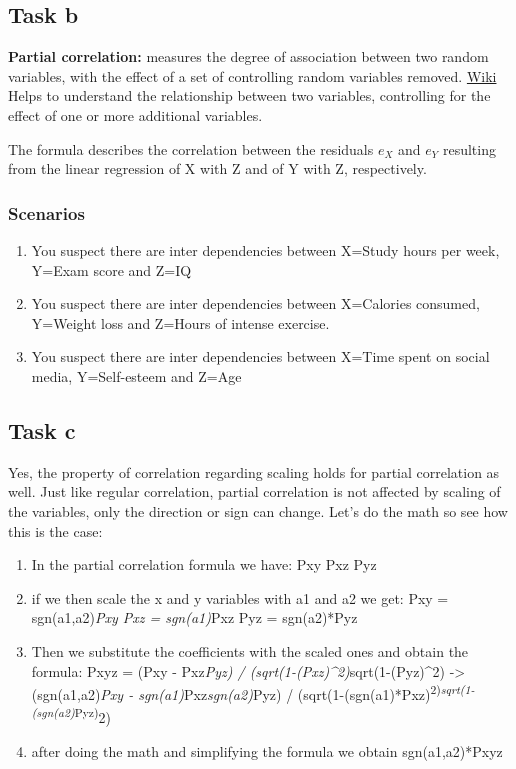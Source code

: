 \documentclass[
]{article}
\providecommand{\tightlist}{%
  \setlength{\itemsep}{0pt}\setlength{\parskip}{0pt}}
\begin{document}
\subsection{Task b}\label{task-b-3}

\textbf{Partial correlation:} measures the degree of association between
two random variables, with the effect of a set of controlling random
variables removed.
\href{https://en.wikipedia.org/wiki/Partial_correlation}{Wiki} Helps to
understand the relationship between two variables, controlling for the
effect of one or more additional variables.

The formula describes the correlation between the residuals \(e_X\) and
\(e_Y\) resulting from the linear regression of X with Z and of Y with
Z, respectively.

\subsubsection{Scenarios}\label{scenarios}

\begin{enumerate}
\def\labelenumi{\arabic{enumi}.}
\tightlist
\item
  You suspect there are inter dependencies between X=Study hours per
  week, Y=Exam score and Z=IQ
\item
  You suspect there are inter dependencies between X=Calories consumed,
  Y=Weight loss and Z=Hours of intense exercise.
\item
  You suspect there are inter dependencies between X=Time spent on
  social media, Y=Self-esteem and Z=Age
\end{enumerate}

\subsection{Task c}\label{task-c-3}

Yes, the property of correlation regarding scaling holds for partial
correlation as well. Just like regular correlation, partial correlation
is not affected by scaling of the variables, only the direction or sign
can change. Let's do the math so see how this is the case:

\begin{enumerate}
\def\labelenumi{\arabic{enumi}.}
\item
  In the partial correlation formula we have: Pxy Pxz Pyz
\item
  if we then scale the x and y variables with a1 and a2 we get: Pxy =
  sgn(a1,a2)\emph{Pxy Pxz = sgn(a1)}Pxz Pyz = sgn(a2)*Pyz
\item
  Then we substitute the coefficients with the scaled ones and obtain
  the formula: Pxy\textbar z = (Pxy - Pxz\emph{Pyz) /
  (sqrt(1-(Pxz)\^{}2)}sqrt(1-(Pyz)\^{}2) -\textgreater{}
  (sgn(a1,a2)\emph{Pxy - sgn(a1)}Pxz\emph{sgn(a2)}Pyz) /
  (sqrt(1-(sgn(a1)*Pxz)\textsuperscript{2)\emph{sqrt(1-(sgn(a2)}Pyz)}2)
\item
  after doing the math and simplifying the formula we obtain
  sgn(a1,a2)*Pxy\textbar z
\end{enumerate}
\end{document}
